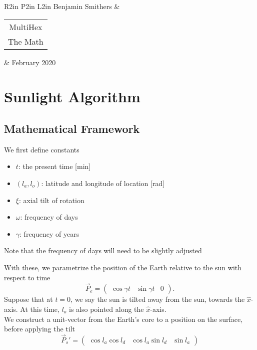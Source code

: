 \documentclass[12pt,a4paper]{article}
\begin{document}
\begin{table}
	\centering
	\begin{tabular}{R{2in} P{2in} L{2in}}
		Benjamin Smithers & \begin{tabular}{c}{\Large MultiHex} \\ {\Large The Math}  \end{tabular} & February 2020 \\\hline
	\end{tabular}

\end{table}

\section{Sunlight Algorithm}
\subsection{Mathematical Framework}
We first define constants
\begin{itemize}
	\item \(t\): the present time [min]
	\item \((l_{a},l_{o})\): latitude and longitude of location [rad]
	\item \(\xi\): axial tilt of rotation 
	\item \(\omega\): frequency of days
	\item \(\gamma\): frequency of years
\end{itemize}
Note that the frequency of days will need to be slightly adjusted 

With these, we parametrize the position of the Earth relative to the sun with respect to time 
\begin{equation}\label{eq:sun_earth}
\vec{P}_{e} = \left( \begin{array}{ccc} \cos\gamma t & \sin\gamma t & 0 \end{array}\right).
\end{equation}
Suppose that at \(t=0\), we say the sun is tilted away from the sun, towards the \(\hat{x}\)-axis. At this time, \(l_{o}\) is also pointed along the \(\hat{x}\)-axis. \\

We construct a unit-vector from the Earth's core to a position on the surface, before applying the tilt
\begin{equation}\label{eq:basic}
\vec{P}_{s}' = \left(\begin{array}{ccc}\cos l_{a}\cos l_{d} & \cos l_{a}\sin l_{d} & \sin l_{a} \end{array}\right)
\end{equation}
\end{document}
